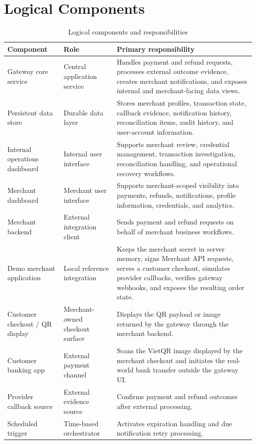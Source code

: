 \newpage
\section{Logical Components}

\begin{table}[!htbp]
\centering
\caption{Logical components and responsibilities}
\begin{tabularx}{\textwidth}{L{0.24\textwidth}L{0.22\textwidth}Y}
\toprule
\textbf{Component} & \textbf{Role} & \textbf{Primary responsibility} \\
\midrule
Gateway core service & Central application service & Handles payment and refund requests, processes external outcome evidence, creates merchant notifications, and exposes internal and merchant-facing data views. \\
\bodyrowrule
Persistent data store & Durable data layer & Stores merchant profiles, transaction state, callback evidence, notification history, reconciliation items, audit history, and user-account information. \\
\bodyrowrule
Internal operations dashboard & Internal user interface & Supports merchant review, credential management, transaction investigation, reconciliation handling, and operational recovery workflows. \\
\bodyrowrule
Merchant dashboard & Merchant user interface & Supports merchant-scoped visibility into payments, refunds, notifications, profile information, credentials, and analytics. \\
\bodyrowrule
Merchant backend & External integration client & Sends payment and refund requests on behalf of merchant business workflows. \\
\bodyrowrule
Demo merchant application & Local reference integration & Keeps the merchant secret in server memory, signs Merchant API requests, serves a customer checkout, simulates provider callbacks, verifies gateway webhooks, and exposes the resulting order state. \\
\bodyrowrule
Customer checkout / QR display & Merchant-owned checkout surface & Displays the QR payload or image returned by the gateway through the merchant backend. \\
\bodyrowrule
Customer banking app & External payment channel & Scans the VietQR image displayed by the merchant checkout and initiates the real-world bank transfer outside the gateway UI. \\
\bodyrowrule
Provider callback source & External evidence source & Confirms payment and refund outcomes after external processing. \\
\bodyrowrule
Scheduled trigger & Time-based orchestrator & Activates expiration handling and due notification retry processing. \\
\bottomrule
\end{tabularx}
\end{table}

